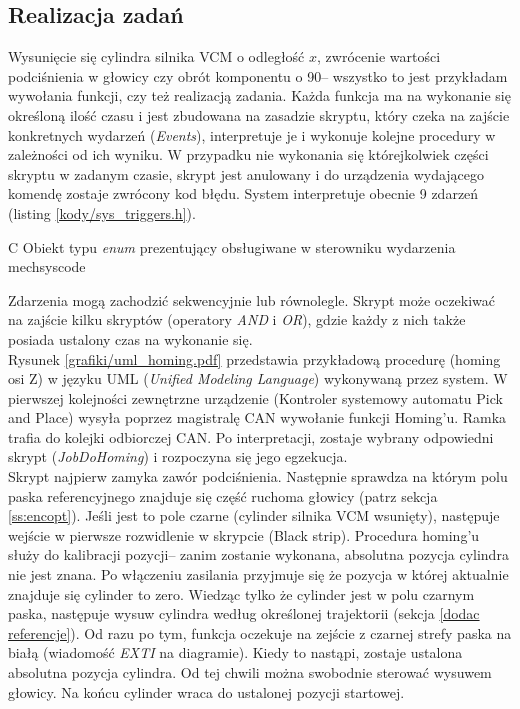 \subsection{Realizacja zadań}

Wysunięcie się cylindra silnika VCM o odległość $ x $, zwrócenie wartości podciśnienia w głowicy czy obrót komponentu o 90\degree -- wszystko to jest przykładam wywołania funkcji, czy też realizacją zadania. Każda funkcja ma na wykonanie się określoną ilość czasu i jest zbudowana na zasadzie skryptu, który czeka na zajście konkretnych wydarzeń ({\it Events}), interpretuje je i wykonuje kolejne procedury w zależności od ich wyniku. W przypadku nie wykonania się którejkolwiek części skryptu w zadanym czasie, skrypt jest anulowany i do urządzenia wydającego komendę zostaje zwrócony kod błędu. System interpretuje obecnie 9 zdarzeń (listing \ref{kody/sys_triggers.h}).

		   {C}
		   {Obiekt typu {\it enum} prezentujący obsługiwane w sterowniku wydarzenia}
		   {mechsyscode}

Zdarzenia mogą zachodzić sekwencyjnie lub równolegle. Skrypt może oczekiwać na zajście kilku skryptów (operatory {\it AND} i {\it OR}), gdzie każdy z nich także posiada ustalony czas na wykonanie się. \\

Rysunek \ref{grafiki/uml_homing.pdf} przedstawia przykładową procedurę (homing osi Z) w języku UML ({\it Unified Modeling Language}) wykonywaną przez system. W pierwszej kolejności zewnętrzne urządzenie (Kontroler systemowy automatu Pick and Place) wysyła poprzez magistralę CAN wywołanie funkcji Homing'u. Ramka trafia do kolejki odbiorczej CAN. Po interpretacji, zostaje wybrany odpowiedni skrypt ({\it JobDoHoming}) i rozpoczyna się jego egzekucja. \\

Skrypt najpierw zamyka zawór podciśnienia. Następnie sprawdza na którym polu paska referencyjnego znajduje się część ruchoma głowicy (patrz sekcja \ref{ss:encopt}). Jeśli jest to pole czarne (cylinder silnika VCM wsunięty), następuje wejście w pierwsze rozwidlenie w skrypcie (Black strip). Procedura homing'u służy do kalibracji pozycji-- zanim zostanie wykonana, absolutna pozycja cylindra nie jest znana. Po włączeniu zasilania przyjmuje się że pozycja w której aktualnie znajduje się cylinder to zero. Wiedząc tylko że cylinder jest w polu czarnym paska, następuje wysuw cylindra według określonej trajektorii (sekcja \ref{dodac referencje}). Od razu po tym, funkcja oczekuje na zejście z czarnej strefy paska na białą (wiadomość {\it EXTI} na diagramie). Kiedy to nastąpi, zostaje ustalona absolutna pozycja cylindra. Od tej chwili można swobodnie sterować wysuwem głowicy. Na końcu cylinder wraca do ustalonej pozycji startowej.


